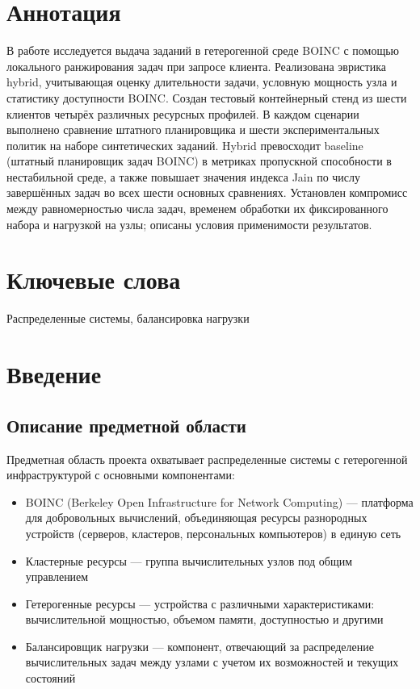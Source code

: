 \documentclass[a4paper,12pt]{extarticle}
\begin{document}
\newpage
\setcounter{page}{2}

{
	\hypersetup{linkcolor=black}
	\tableofcontents
}

\newpage

\newpage
\section*{Аннотация}   %
В работе исследуется выдача заданий в гетерогенной среде BOINC с помощью локального ранжирования задач при запросе клиента. Реализована эвристика hybrid, учитывающая оценку длительности задачи, условную мощность узла и статистику доступности BOINC. Создан тестовый контейнерный стенд из шести клиентов четырёх различных ресурсных профилей. В каждом сценарии выполнено сравнение штатного планировщика и шести экспериментальных политик на наборе синтетических заданий. Hybrid превосходит baseline (штатный планировщик задач BOINC) в метриках пропускной способности в нестабильной среде, а также повышает значения индекса Jain по числу завершённых задач во всех шести основных сравнениях. Установлен компромисс между равномерностью числа задач, временем обработки их фиксированного набора и нагрузкой на узлы; описаны условия применимости результатов.


\section*{Ключевые слова}
Распределенные системы, балансировка нагрузки
\pagebreak

\section{Введение} 
\subsection{Описание предметной области}
Предметная область проекта охватывает распределенные системы с гетерогенной инфраструктурой с основными компонентами:
\begin{itemize}
    \item BOINC (Berkeley Open Infrastructure for Network Computing) — платформа для добровольных вычислений, объединяющая ресурсы разнородных устройств (серверов, кластеров, персональных компьютеров) в единую сеть~\cite{boinc-lb}
    \item Кластерные ресурсы — группа вычислительных узлов под общим управлением
    \item Гетерогенные ресурсы — устройства с различными характеристиками: вычислительной мощностью, объемом памяти, доступностью и другими
    \item Балансировщик нагрузки — компонент, отвечающий за распределение вычислительных задач между узлами с учетом их возможностей и текущих состояний
\end{itemize}
\end{document}
